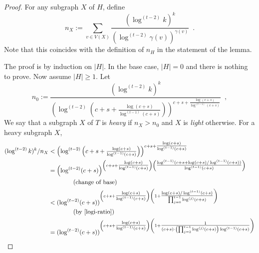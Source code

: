\documentclass[kpfonts]{patmorin}
\theoremstyle{named}
\begin{document}
\begin{proof}
    For any subgraph $X$ of $H$, define
    \[
        n_{X}:=\sum_{v\in V(X)}\frac{(\log^{(t-2)} k)^k}{(\log^{(t-2)}\gamma(v))^{\gamma(v)}} \enspace .
    \]
    Note that this coincides with the definition of $n_H$ in the statement of the lemma.

    The proof is by induction on $|H|$.  In the base case, $|H|=0$ and there is nothing to prove.
    Now assume $|H|\ge 1$.  Let
    \begin{equation}
        n_0 := \frac{(\log^{(t-2)} k)^k}{\left(\log^{(t-2)}\left(c+s+\tfrac{\log(c+s)}{\log^{(t-1)}(c+s)}\right)\right)^{c+s+\tfrac{\log(c+s)}{\log^{(t-1)}(c+s)}}} \enspace , \label{heavy-def}
    \end{equation}
    We say that a subgraph $X$ of $T$ is \emph{heavy} if $n_X>n_0$ and $X$ is \emph{light} otherwise.  For a heavy subgraph $X$,
    \begin{align*}
        (\log^{(t-2)} k)^k/n_X & < \left(\log^{(t-2)}\left(c+s+\tfrac{\log(c+s)}{\log^{(t-1)}(c+s)}\right)\right)^{c+s+\tfrac{\log(c+s)}{\log^{(t-1)}(c+s)}} \\
        & = \left(\log^{(t-2)}(c+s)\right)^{\left(c+s+\tfrac{\log(c+s)}{\log^{(t-1)}(c+s)}\right)
            \left(\tfrac{\log^{(t-1)}(c+s+\log(c+s)/\log^{(t-1)}(c+s))}{\log^{(t-1)}(c+s)}\right)} \\
            & \qquad\qquad\text{(change of base)} \\
        & < (\log^{(t-2)}(c+s))^{\left(c+s+\tfrac{\log(c+s)}{\log^{(t-1)}(c+s)}\right)
            \left(1 + \tfrac{\log(c+s)/\log^{(t-1)}(c+s)}{\prod_{j=0}^{t-1}\log^{(j)}(c+s)}\right)} \\
            & \qquad\qquad\text{(by \cref{logi-ratio})}\\
        & = (\log^{(t-2)}(c+s))^{\left(c+s+\tfrac{\log(c+s)}{\log^{(t-1)}(c+s)}\right)
            \left(1 + \tfrac{1}{(c+s)\cdot\left(\prod_{j=2}^{t-1}\log^{(j)}(c+s)\right)\log^{(t-1)}(c+s)}\right)} \\

\end{align*}
\end{proof}
\end{document}
